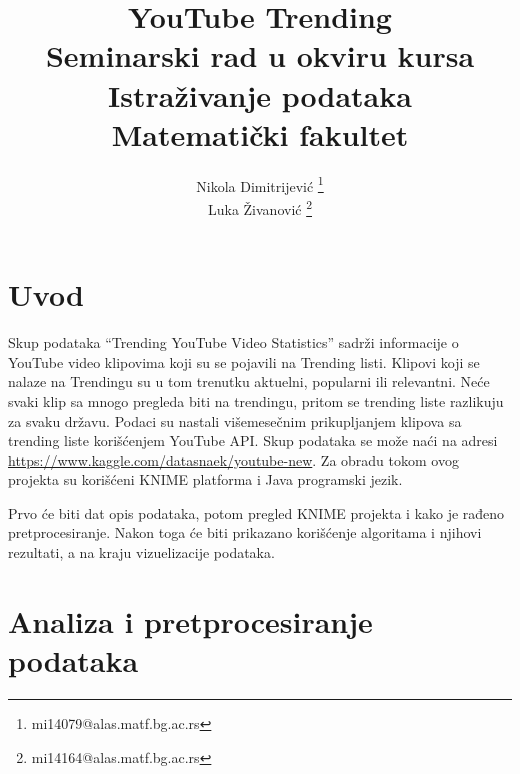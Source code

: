 \documentclass[a4paper]{article}
\theoremstyle{definition}
\begin{document}
\title{YouTube Trending\\ \small{Seminarski rad u okviru kursa\\Istraživanje podataka\\ Matematički fakultet}}

\author{Nikola Dimitrijević \footnote{mi14079@alas.matf.bg.ac.rs}\\
        Luka Živanović \footnote{mi14164@alas.matf.bg.ac.rs}\\
 }
\vspace*{-3cm}
    {\let\newpage\relax\maketitle}

\tableofcontents

\newpage



\section{Uvod}
\label{sec:uvod}
Skup podataka ``Trending YouTube Video Statistics'' sadrži informacije o YouTube video klipovima koji su se pojavili na Trending listi.
Klipovi koji se nalaze na Trendingu su u tom trenutku aktuelni, popularni ili relevantni. Neće svaki klip sa mnogo pregleda biti na trendingu,
 pritom se trending liste razlikuju za svaku državu. Podaci su nastali višemesečnim prikupljanjem klipova sa trending liste korišćenjem YouTube API.
Skup podataka se može naći na adresi \url{https://www.kaggle.com/datasnaek/youtube-new}.
Za obradu tokom ovog projekta su korišćeni KNIME platforma i Java programski jezik.

Prvo će biti dat opis podataka, potom pregled KNIME projekta i kako je rađeno pretprocesiranje. Nakon toga će biti prikazano korišćenje algoritama i njihovi rezultati, a na kraju
vizuelizacije podataka.
\section{Analiza i pretprocesiranje podataka}


\label{sec:analiza}
\end{document}
